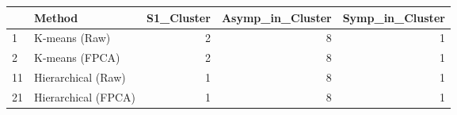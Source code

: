 
\begin{tabular}{llrrr}
\toprule
  & Method & S1\_Cluster & Asymp\_in\_Cluster & Symp\_in\_Cluster\\
\midrule
1 & K-means (Raw) & 2 & 8 & 1\\
2 & K-means (FPCA) & 2 & 8 & 1\\
11 & Hierarchical (Raw) & 1 & 8 & 1\\
21 & Hierarchical (FPCA) & 1 & 8 & 1\\
\bottomrule
\end{tabular}
